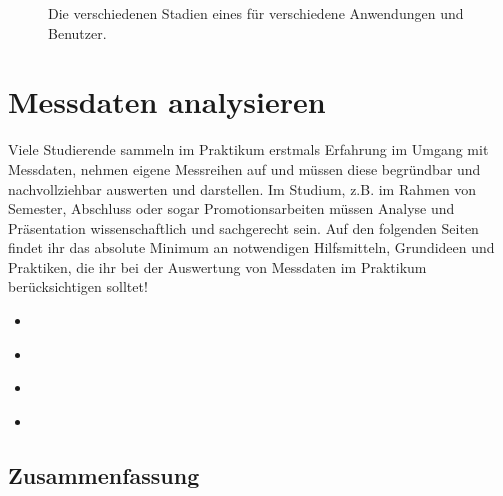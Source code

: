 \documentclass[letterpaper,10pt,english]{jupyterBook}
\let\sphinxpxdimen\pdfpxdimen\else\newdimen\sphinxpxdimen
\begin{document}
\begin{figure}[htbp]
\centering
\capstart

\noindent\sphinxincludegraphics[width=600\sphinxpxdimen]{{normal}.jpg}
\caption{Die verschiedenen Stadien eines  für verschiedene Anwendungen und Benutzer.}\label{\detokenize{content/1_Messen_Einheit:normal}}\end{figure}

\sphinxstepscope


\chapter{Messdaten analysieren}
\label{\detokenize{content/1_Datenanalyse:messdaten-analysieren}}\label{\detokenize{content/1_Datenanalyse::doc}}
\sphinxAtStartPar
Viele Studierende sammeln im Praktikum erstmals Erfahrung im Umgang mit Messdaten, nehmen eigene Messreihen auf und müssen diese begründbar und nachvollziehbar auswerten und darstellen. Im Studium, z.B. im Rahmen von Semester\sphinxhyphen{}, Abschluss\sphinxhyphen{} oder sogar Promotionsarbeiten müssen Analyse und Präsentation wissenschaftlich und sachgerecht sein. Auf den folgenden Seiten findet ihr das absolute Minimum an notwendigen Hilfsmitteln, Grundideen und Praktiken, die ihr bei der Auswertung von Messdaten im Praktikum berücksichtigen solltet!
\begin{itemize}
\item {} 
\sphinxAtStartPar
{\hyperref[\detokenize{content/1_Messunsicherheiten::doc}]{}}

\item {} 
\sphinxAtStartPar
{\hyperref[\detokenize{content/1_Mittelwert_StdAbw::doc}]{}}

\item {} 
\sphinxAtStartPar
{\hyperref[\detokenize{content/1_Fehlerfortpflanzung::doc}]{}}

\item {} 
\sphinxAtStartPar
{\hyperref[\detokenize{content/1_Kurvenanpassung::doc}]{}}

\end{itemize}


\section{Zusammenfassung}
\label{\detokenize{content/1_Datenanalyse:zusammenfassung}}
\end{document}
